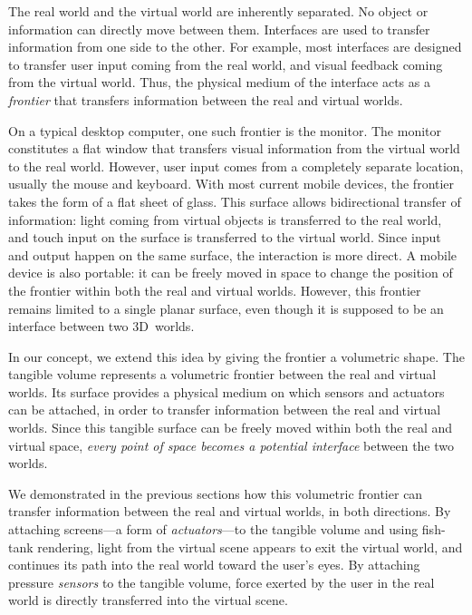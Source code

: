 \documentclass{vgtc}                         \havecopyrightspacefalse
\begin{document}
The real world and the virtual world are inherently separated. No object or information can directly move between them. Interfaces are used to transfer information from one side to the other. For example, most interfaces are designed to transfer user input coming from the real world, and visual feedback coming from the virtual world. Thus, the physical medium of the interface acts as a \emph{frontier} that transfers information between the real and virtual worlds.

On a typical desktop computer, one such frontier is the monitor. The monitor constitutes a flat window that transfers visual information from the virtual world to the real world. However, user input comes from a completely separate location, usually the mouse and keyboard. With most current mobile devices, the frontier takes the form of a flat sheet of glass. This surface allows bidirectional transfer of information: light coming from virtual objects is transferred to the real world, and touch input on the surface is transferred to the virtual world. Since input and output happen on the same surface, the interaction is more direct. A mobile device is also portable: it can be freely moved in space to change the position of the frontier within both the real and virtual worlds. However, this frontier remains limited to a single planar surface, even though it is supposed to be an interface between two 3D~worlds.

In our concept, we extend this idea by giving the frontier a volumetric shape. The tangible volume represents a volumetric frontier between the real and virtual worlds. Its surface provides a physical medium on which sensors and actuators can be attached, in order to transfer information between the real and virtual worlds. Since this tangible surface can be freely moved within both the real and virtual space, \emph{every point of space becomes a potential interface} between the two worlds.

We demonstrated in the previous sections how this volumetric frontier can transfer information between the real and virtual worlds, in both directions. By attaching screens---a form of \emph{actuators}---to the tangible volume and using fish-tank rendering, light from the virtual scene appears to exit the virtual world, and continues its path into the real world toward the user's eyes. By attaching pressure \emph{sensors} to the tangible volume, force exerted by the user in the real world is directly transferred into the virtual scene.
\end{document}
